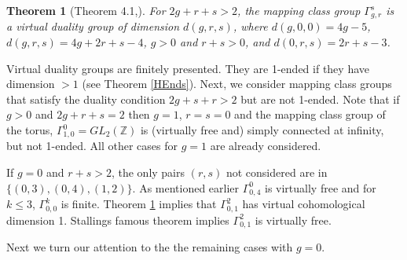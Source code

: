 \documentclass[12pt]{article}
\newtheorem{theorem}{Theorem}[subsection]
\begin{document}
 \begin{theorem} [Theorem 4.1,\cite{Har86}] \label{MCGVDG}  
For $2g + r +s > 2$, the mapping class group $\Gamma_{g,r}^s$ is a virtual duality group  of dimension $d(g, r, s)$, where $d(g, 0,0)=4g-5$, $d(g,r,s)=4g+2r+s-4$, $g>0$ and $r+s>0$, and $d(0,r,s)=2r + s-3$. %
 \end{theorem}
 Virtual duality groups are finitely presented. They are 1-ended if they have dimension $>1$ (see Theorem \ref{HEnds}). Next, we consider mapping class groups that satisfy the duality condition $2g+s+r>2$ but are not 1-ended. Note that if $g>0$ and $2g+r+s=2$ then $g=1$, $r=s=0$ and the mapping class group of the torus, $\Gamma_{1,0}^0=GL_2(\mathbb Z)$ is (virtually free and) simply connected at infinity, but not 1-ended. All other cases for $g=1$ are already considered.

 If $g=0$ and $r+s>2$,   the only pairs $(r,s)$ not considered are in $\{(0,3), (0,4), (1,2)\}$. As mentioned earlier $\Gamma_{0,4}^0$ is virtually free and for $k\leq 3$, $\Gamma_{0,0}^k$  is finite. Theorem \ref{MCGVDG} implies that $\Gamma_{0,1}^2$ has virtual cohomological dimension 1. Stallings famous theorem \cite{St68} implies  $\Gamma_{0,1}^2$ is virtually free. 

Next we turn our attention to the the remaining cases with $g=0$. 
\end{document}
